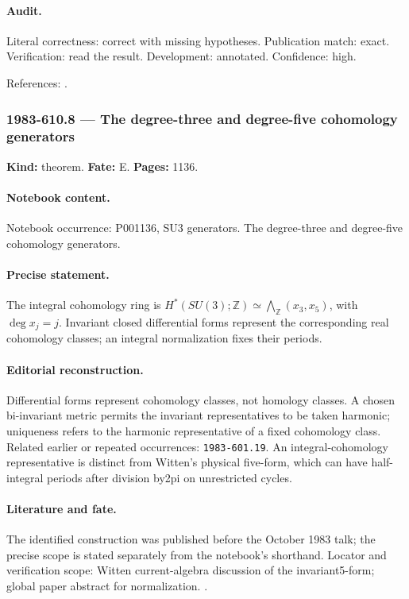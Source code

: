 \paragraph{Audit.} Literal correctness: correct with missing hypotheses. Publication match: exact. Verification: read the result. Development: annotated. Confidence: high.

\noindent References: \citep{witten1983current,hatcher2002algebraic}.\par

\subsubsection{1983-610.8 --- The degree-three and degree-five cohomology generators}

\label{item:1983-610.8}

\noindent\textbf{Kind:} theorem. \textbf{Fate:} E. \textbf{Pages:} 1136.\par

\paragraph{Notebook content.} Notebook occurrence: P001136, SU3 generators. The degree-three and degree-five cohomology generators.

\paragraph{Precise statement.} The integral cohomology ring is \(H^*(SU(3);\mathbb Z)\simeq\bigwedge_{\mathbb Z}(x_3,x_5)\), with \(\deg x_j=j\). Invariant closed differential forms represent the corresponding real cohomology classes; an integral normalization fixes their periods.

\paragraph{Editorial reconstruction.} Differential forms represent cohomology classes, not homology classes. A chosen bi-invariant metric permits the invariant representatives to be taken harmonic; uniqueness refers to the harmonic representative of a fixed cohomology class. Related earlier or repeated occurrences: \texttt{1983-601.19}. An integral-cohomology representative is distinct from Witten's physical five-form, which can have half-integral periods after division by2pi on unrestricted cycles.

\paragraph{Literature and fate.} The identified construction was published before the October 1983 talk; the precise scope is stated separately from the notebook's shorthand. Locator and verification scope: Witten current-algebra discussion of the invariant5-form; global paper abstract for normalization. \cite{witten1983current,witten1983global}.

